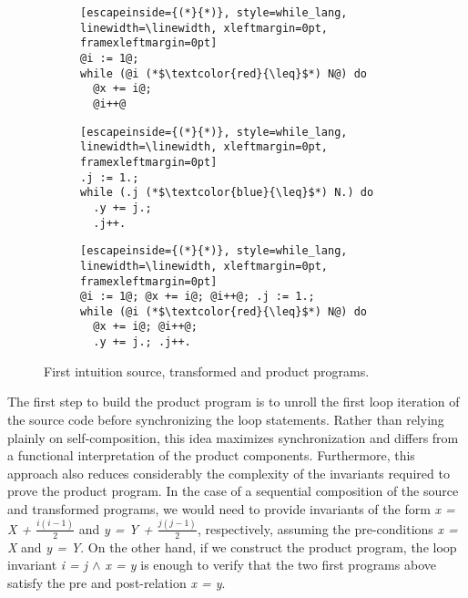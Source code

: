 \begin{figure}[h]
  \centering

  \begin{subfigure}[t]{0.28\textwidth}
    \centering
    \par\smallskip
    \noindent
    \begin{lstlisting}[escapeinside={(*}{*)}, style=while_lang, linewidth=\linewidth, xleftmargin=0pt, framexleftmargin=0pt]
@i := 1@; 
while (@i (*$\textcolor{red}{\leq}$*) N@) do
  @x += i@;
  @i++@
    \end{lstlisting}
  \end{subfigure}\hfill%
  \begin{subfigure}[t]{0.28\textwidth}
    \centering
    \par\smallskip
    \noindent
    \begin{lstlisting}[escapeinside={(*}{*)}, style=while_lang, linewidth=\linewidth, xleftmargin=0pt, framexleftmargin=0pt]
.j := 1.; 
while (.j (*$\textcolor{blue}{\leq}$*) N.) do
  .y += j.;
  .j++.
    \end{lstlisting}
  \end{subfigure}\hfill%
  \begin{subfigure}[t]{0.4\textwidth}
    \centering
    \par\smallskip
    \noindent
    \begin{lstlisting}[escapeinside={(*}{*)}, style=while_lang, linewidth=\linewidth, xleftmargin=0pt, framexleftmargin=0pt]
@i := 1@; @x += i@; @i++@; .j := 1.;
while (@i (*$\textcolor{red}{\leq}$*) N@) do
  @x += i@; @i++@;
  .y += j.; .j++.
    \end{lstlisting}
  \end{subfigure}

  \caption{First intuition source, transformed and product programs.}
  \label{fig:pp_first_intuition}
\end{figure}

The first step to build the product program is to unroll the first loop iteration of the source code before synchronizing the loop statements.
Rather than relying plainly on self-composition, this idea maximizes synchronization and differs from a functional interpretation of the product components.
Furthermore, this approach also reduces considerably the complexity of the invariants required to prove the product program.
In the case of a sequential composition of the source and transformed programs, we would need to provide invariants of the form \emph{x = X + $\frac{i(i-1)}{2}$} and \emph{y = Y + $\frac{j(j-1)}{2}$}, respectively, assuming the pre-conditions \emph{x = X} and \emph{y = Y}.
On the other hand, if we construct the product program, the loop invariant \emph{i = j $\land$ x = y} is enough to verify that the two first programs above satisfy the pre and post-relation \emph{x = y}.


